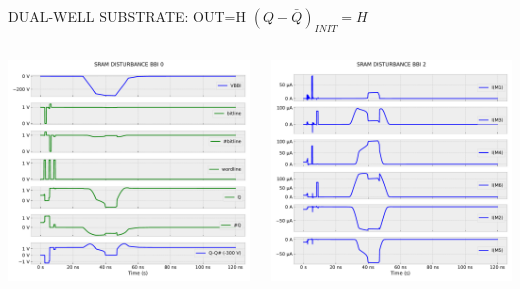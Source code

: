 
\begin{frame}{DUAL-WELL SUBSTRATE: OUT=H}
	\vspace{5mm}
	$(Q-\bar{Q})_{INIT}=H$
	\vspace{5mm}
	\begin{columns}
		\begin{column}{0.5\textwidth}
			\centering
			\includegraphics[width=\textwidth]{./figures/SRAMBBI0_zHIGH_DW-300.pdf}
		\end{column}
		\begin{column}{0.5\textwidth}
			\centering
			\includegraphics[width=\textwidth]{./figures/SRAMBBI2_zHIGH_DW-300.pdf}
		\end{column}
	\end{columns}
\end{frame}
